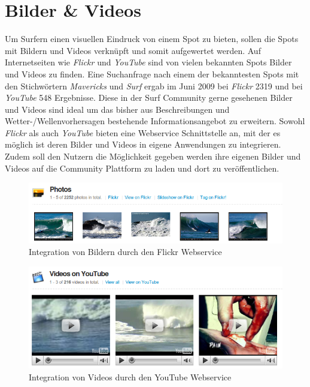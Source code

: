 \section{Bilder \& Videos}

Um Surfern einen visuellen Eindruck von einem Spot zu bieten, sollen
die Spots mit Bildern und Videos verknüpft und somit aufgewertet
werden. Auf Internetseiten wie \textit{Flickr} und \textit{YouTube}
sind von vielen bekannten Spots Bilder und Videos zu finden. Eine
Suchanfrage nach einem der bekanntesten Spots mit den Stichwörtern
\textit{Mavericks} und \textit{Surf} ergab im Juni 2009 bei
\textit{Flickr} 2319 und bei \textit{YouTube} 548 Ergebnisse. Diese in
der Surf Community gerne gesehenen Bilder und Videos sind ideal um das
bisher aus Beschreibungen und Wetter-/Wellenvorhersagen bestehende
Informationsangebot zu erweitern. Sowohl \textit{Flickr} als auch
\textit{YouTube} bieten eine Webservice Schnittstelle an, mit der es
möglich ist deren Bilder und Videos in eigene Anwendungen zu
integrieren. Zudem soll den Nutzern die Möglichkeit gegeben werden
ihre eigenen Bilder und Videos auf die Community Plattform zu laden
und dort zu veröffentlichen.

\begin{figure}[h]
  \begin{center}
    \includegraphics[width=\textwidth]{bilder/photos-flickr}
    \caption{Integration von Bildern durch den Flickr Webservice}
    \label{piktogramm}
  \end{center}
\end{figure}

\begin{figure}[h]
  \begin{center}
    \includegraphics[width=\textwidth]{bilder/videos-youtube}
    \caption{Integration von Videos durch den YouTube Webservice}
    \label{piktogramm}
  \end{center}
\end{figure}

